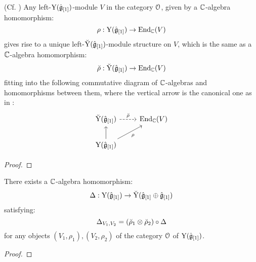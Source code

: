         \begin{lemma} \label{lemma: lifting_representations_of_affine_yangians_to_root_grading_completions}
            (Cf. \cite[Proposition 5.14]{guay_nakajima_wendlandt_affine_yangian_coproduct}) Any left-$\mathrm{Y}(\hat{\mathfrak{g}}_{[1]})$-module $V$ in the category $\mathcal{O}$, given by a $\mathbb{C}$-algebra homomorphism:
                $$\rho: \mathrm{Y}(\hat{\mathfrak{g}}_{[1]}) \to \mathrm{End}_{\mathbb{C}}(V)$$
            gives rise to a unique left-$\breve{\mathrm{Y}}(\hat{\mathfrak{g}}_{[1]})$-module structure on $V$, which is the same as a $\mathbb{C}$-algebra homomorphism:
                $$\breve{\rho}: \breve{\mathrm{Y}}(\hat{\mathfrak{g}}_{[1]}) \to \mathrm{End}_{\mathbb{C}}(V)$$
            fitting into the following commutative diagram of $\mathbb{C}$-algebras and homomorphisms between them, where the vertical arrow is the canonical one as in \cite[Section 5, Lemma 5.3]{guay_nakajima_wendlandt_affine_yangian_coproduct}:
                $$
                    \begin{tikzcd}
                	{\breve{\rmY}(\hat{\g}_{[1]})} & {\End_{\bbC}(V)} \\
                	{\rmY(\hat{\g}_{[1]})}
                	\arrow[from=2-1, to=1-1]
                	\arrow["{\breve{\rho}}", dashed, from=1-1, to=1-2]
                	\arrow["\rho"', from=2-1, to=1-2]
                    \end{tikzcd}
                $$
        \end{lemma}
            \begin{proof}
                
            \end{proof}
        \begin{proposition} \label{prop: hopf_coproduct_on_yangians}
            There exists a $\mathbb{C}$-algebra homomorphism:
                $$\Delta: \mathrm{Y}(\hat{\mathfrak{g}}_{[1]}) \to \breve{\mathrm{Y}}(\hat{\mathfrak{g}}_{[1]} \oplus \hat{\mathfrak{g}}_{[1]})$$
            satisfying:
                $$\Delta_{V_1, V_2} = (\breve{\rho}_1 \tensor \breve{\rho}_2) \circ \Delta$$
            for any objects $(V_1, \rho_1), (V_2, \rho_2)$ of the category $\mathcal{O}$ of $\mathrm{Y}(\hat{\mathfrak{g}}_{[1]})$.
        \end{proposition}
            \begin{proof}
                
            \end{proof}
        

